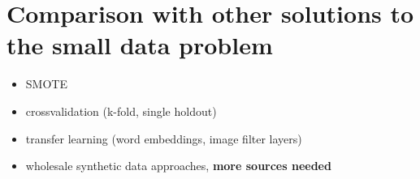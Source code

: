 \chapter{Comparison with other solutions to the small data problem}


\begin{itemize}
	\item \ac{SMOTE}
	\item crossvalidation (k-fold, single holdout)
	\item transfer learning (word embeddings, image filter layers)
	\item wholesale synthetic data approaches, \cite{10.1145/3339252.3339281}  \textbf{more sources needed}
\end{itemize}

\Blindtext[4][1]
